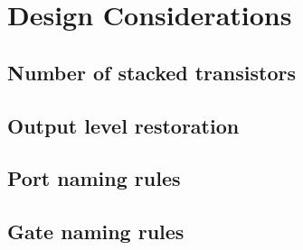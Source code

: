 \chapter{Design Considerations}

\section{Number of stacked transistors}
\section{Output level restoration}
\section{Port naming rules}
\section{Gate naming rules}

\clearpage
